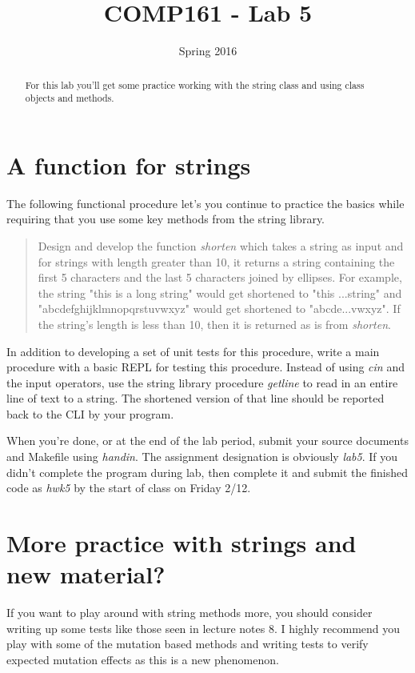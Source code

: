 \documentclass[]{tufte-handout}
\title{COMP161 - Lab 5}
\author{}
\date{Spring 2016}
\begin{document}
\maketitle

\begin{abstract}
For this lab you'll get some practice working with the string class and using class objects and methods. 
\end{abstract}

\section{ A function for strings }

The following functional procedure let's you continue to practice the basics while requiring that you use some key methods from the string library. 
\begin{quote}
Design and develop the function \textit{shorten} which takes a string as input and for strings with length greater than 10, it returns a string containing the first 5 characters and the last 5 characters joined by ellipses. For example, the string "this is a long string" would get shortened to "this ...string" and "abcdefghijklmnopqrstuvwxyz" would get shortened to "abcde...vwxyz". If the string's length is less than 10, then it is returned as is from \textit{shorten}. 
\end{quote}
In addition to developing a set of unit tests for this procedure, write a main procedure with a basic REPL for testing this procedure. Instead of using \textit{cin} and the input operators, use the string library procedure \textit{getline} to read in an entire line of text to a string. The shortened version of that line should be reported back to the CLI by your program.

When you're done, or at the end of the lab period, submit your source documents and Makefile using \textit{handin}. The assignment designation is obviously \textit{lab5}. If you didn't complete the program during lab, then complete it and submit the finished code as \textit{hwk5} by the start of class on Friday 2/12.

\section{ More practice with strings and new material? }

If you want to play around with string methods more, you should consider writing up some tests like those seen in lecture notes 8. I highly recommend you play with some of the mutation based methods and writing tests to verify expected mutation effects as this is a new phenomenon.
\end{document}
